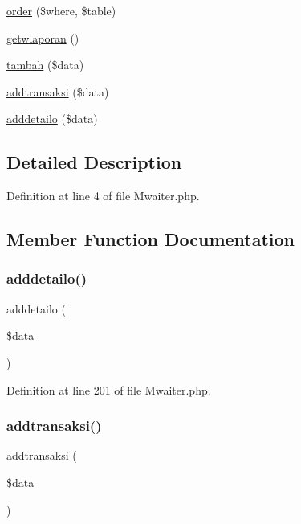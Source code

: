 \begin{DoxyCompactItemize}
\item 
\mbox{\hyperlink{class_mwaiter_a4fbd9d3452149bf51f6f9549a72baa3e}{order}} (\$where, \$table)
\item 
\mbox{\hyperlink{class_mwaiter_a82e9dda7b6ade10e8a58283ad7c3dbb8}{getwlaporan}} ()
\item 
\mbox{\hyperlink{class_mwaiter_a323e89388e0e68d8196e4d5d4be3d2ba}{tambah}} (\$data)
\item 
\mbox{\hyperlink{class_mwaiter_a82956de7210ac7c8eea060dd764c7f27}{addtransaksi}} (\$data)
\item 
\mbox{\hyperlink{class_mwaiter_ab811711f796526f5bcce232f636655f4}{adddetailo}} (\$data)
\end{DoxyCompactItemize}


\subsection{Detailed Description}


Definition at line 4 of file Mwaiter.\+php.



\subsection{Member Function Documentation}
\mbox{\label{class_mwaiter_ab811711f796526f5bcce232f636655f4}} 
\subsubsection{\texorpdfstring{adddetailo()}{adddetailo()}}
{\footnotesize\ttfamily adddetailo (\begin{DoxyParamCaption}\item[{}]{\$data }\end{DoxyParamCaption})}



Definition at line 201 of file Mwaiter.\+php.

\mbox{\label{class_mwaiter_a82956de7210ac7c8eea060dd764c7f27}} 
\subsubsection{\texorpdfstring{addtransaksi()}{addtransaksi()}}
{\footnotesize\ttfamily addtransaksi (\begin{DoxyParamCaption}\item[{}]{\$data }\end{DoxyParamCaption})}



